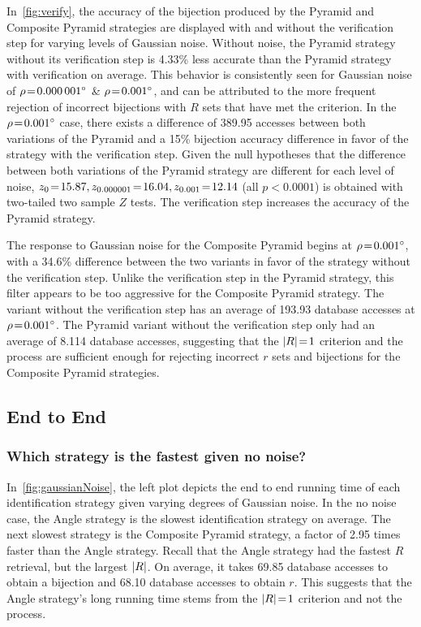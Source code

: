 In~\autoref{fig:verify}, the accuracy of the bijection produced by the Pyramid and Composite Pyramid strategies are
displayed with and without the verification step for varying levels of Gaussian noise.
Without noise, the Pyramid strategy without its verification step is 4.33\% less accurate than the Pyramid strategy with
verification on average.
This behavior is consistently seen for Gaussian noise of $\rho\!=\!\ang{0.000001}$ \& $\rho\!=\!\ang{0.001}$, and
can be attributed to the more frequent rejection of incorrect bijections with $R$ sets that have met the criterion.
In the $\rho\!=\!\ang{0.001}$ case, there exists a difference of 389.95 accesses between both variations of the Pyramid
and a 15\% bijection accuracy difference in favor of the strategy with the verification step.
Given the null hypotheses that the difference between both variations of the Pyramid strategy are different for each
level of noise, $z_0 \!=\! 15.87, z_{0.000001} \!=\! 16.04, z_{0.001} \!=\! 12.14$ (all $p\!<\!0.0001$) is obtained with
two-tailed two sample $Z$ tests.
The verification step increases the accuracy of the Pyramid strategy.

The response to Gaussian noise for the Composite Pyramid begins at $\rho\!=\!\ang{0.001}$, with a 34.6\% difference
between the two variants in favor of the strategy without the verification step.
Unlike the verification step in the Pyramid strategy, this filter appears to be too aggressive for the Composite Pyramid
strategy.
The variant without the verification step has an average of 193.93 database accesses at $\rho\!=\!\ang{0.001}$.
The Pyramid variant without the verification step only had an average of 8.114 database accesses, suggesting that the
$\left| R \right| \!=\! 1$ criterion and the  process are sufficient enough for rejecting incorrect $r$ sets and
bijections for the Composite Pyramid strategies.

\subsection{End to End}\label{subsec:endToEndEvaluation}
\subsubsection{Which strategy is the fastest given no noise?}
In~\autoref{fig:gaussianNoise}, the left plot depicts the end to end running time of each identification strategy given
varying degrees of Gaussian noise.
In the no noise case, the Angle strategy is the slowest identification strategy on average.
The next slowest strategy is the Composite Pyramid strategy, a factor of 2.95 times faster than the Angle strategy.
Recall that the Angle strategy had the fastest $R$ retrieval, but the largest $\left| R \right|$.
On average, it takes 69.85 database accesses to obtain a bijection and 68.10 database accesses to obtain $r$.
This suggests that the Angle strategy's long running time stems from the $\left| R \right| \!=\! 1$ criterion and not the
 process.

